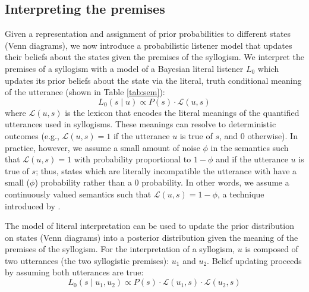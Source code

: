 \documentclass[floatsintext, doc]{apa6}
\begin{document}
\subsection{Interpreting the premises}

Given a representation and assignment of prior probabilities to different states (Venn diagrams), we now introduce a probabilistic listener model that updates their beliefs about the states given the premises of the syllogism. 
We interpret the premises of a syllogism with a model of a Bayesian literal listener $L_0$ which updates its prior beliefs about the state via the literal, truth conditional meaning of the utterance (shown in Table \ref{tab:sem}):
\begin{equation}
L_0(s \mid u ) \propto P(s)\cdot \mathcal{L}(u, s) 
\label{eq:L0}
\end{equation}
\noindent where $\mathcal{L}(u, s)$ is the lexicon that encodes the literal meanings of the quantified utterances used in syllogisms. 
These meanings can resolve to deterministic outcomes (e.g., $\mathcal{L}(u, s) = 1$ if the utterance $u$ is true of $s$, and 0 otherwise). 
In practice, however, we assume a small amount of noise $\phi$ in the semantics such that $\mathcal{L}(u, s) = 1$ with probability proportional to $1-\phi$ and if the utterance $u$ is true of $s$; thus, states which are literally incompatible the utterance with have a small ($\phi$) probability rather than a 0 probability.
In other words, we assume a continuously valued semantics such that $\mathcal{L}(u, s) = 1-\phi$, a technique introduced by .


The model of literal interpretation can be used to update the prior distribution on states (Venn diagrams) into a posterior distribution given the meaning of the premises of the syllogism. 
For the interpretation of a syllogism, $u$ is composed of two utterances (the two syllogistic premises): $u_1$ and $u_2$. 
Belief updating proceeds by assuming both utterances are true: 
\begin{equation}
L_0(s \mid u_1,  u_2) \propto P(s)\cdot \mathcal{L}(u_1, s) \cdot \mathcal{L}(u_2, s) 
\label{eq:L0premises}
\end{equation}
\end{document}
